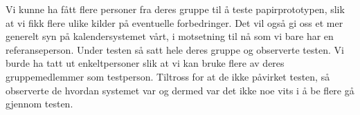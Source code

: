 Vi kunne ha fått flere personer fra deres gruppe til å teste papirprototypen, slik at vi fikk flere ulike kilder på eventuelle forbedringer. Det vil også gi oss et mer generelt syn på kalendersystemet vårt, i motsetning til nå som vi bare har en referanseperson. Under testen så satt hele deres gruppe og observerte testen. Vi burde ha tatt ut enkeltpersoner slik at vi kan bruke flere av deres gruppemedlemmer som testperson. Tiltross for at de ikke påvirket testen, så observerte de hvordan systemet var og dermed var det ikke noe vits i å be flere gå gjennom testen. 